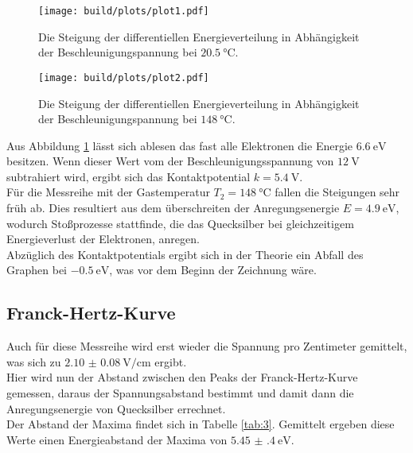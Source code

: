 \begin{figure}[H]
    \centering
    \texttt{[image: build/plots/plot1.pdf]}
    \caption{Die Steigung der differentiellen Energieverteilung in Abhängigkeit der Beschleunigungspannung bei $\SI{20.5}{\celsius}$.}
    \label{img:1}
\end{figure}

\begin{figure}[H]
    \centering
    \texttt{[image: build/plots/plot2.pdf]}
    \caption{Die Steigung der differentiellen Energieverteilung in Abhängigkeit der Beschleunigungspannung bei $\SI{148}{\celsius}$.}
    \label{img:2}
\end{figure}

\noindent
Aus Abbildung \ref{img:1} lässt sich ablesen das fast alle Elektronen die Energie $\SI{6.6}{\eV}$ besitzen. 
Wenn dieser Wert vom der Beschleunigungsspannung von $\SI{12}{\volt}$ subtrahiert wird, ergibt sich das Kontaktpotential $k=\SI{5.4}{\volt}$.\\
Für die Messreihe mit der Gastemperatur $T_2=\SI{148}{\celsius}$ fallen die Steigungen sehr früh ab. 
Dies resultiert aus dem überschreiten der Anregungsenergie $E=\SI{4.9}{\eV}$\cite{theo}, wodurch Stoßprozesse stattfinde, die das Quecksilber bei gleichzeitigem Energieverlust der Elektronen, anregen.\\
Abzüglich des Kontaktpotentials ergibt sich in der Theorie ein Abfall des Graphen bei $\SI{-0.5}{\eV}$, was vor dem Beginn der Zeichnung wäre.


\subsection{Franck-Hertz-Kurve}

\noindent Auch für diese Messreihe wird erst wieder die Spannung pro Zentimeter gemittelt, was sich zu $\SI{2.10(8)}{\volt\per\centi\metre}$ ergibt.\\
Hier wird nun der Abstand zwischen den Peaks der Franck-Hertz-Kurve gemessen, daraus der Spannungsabstand bestimmt und damit dann die Anregungsenergie von Quecksilber errechnet.\\
Der Abstand der Maxima findet sich in Tabelle \ref{tab:3}. Gemittelt ergeben diese Werte einen Energieabstand der Maxima von $\SI{5.45(40)}{\eV}$.

